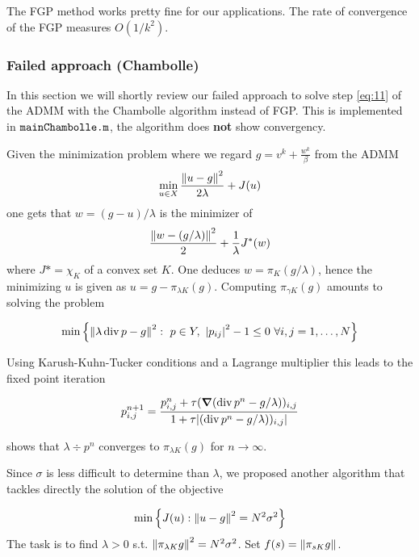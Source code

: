 The FGP method works pretty fine for our applications.
The rate of convergence of the FGP measures $O(1/k^2)$.

\subsubsection{Failed approach (Chambolle)} \label{subsec:chambolle}
In this section we will shortly review our failed approach to solve step \ref{eq:11} of the ADMM with the Chambolle algorithm \cite{MR2049783} instead of FGP. This is implemented in $\texttt{mainChambolle.m}$, the algorithm does \textbf{not} show convergency.

Given the minimization problem where we regard $g = v^k + \frac{w^k}{\beta}$ from the ADMM
\begin{equation}
    \min_{u \in X} \frac{\left\lVert u-g\right\rVert^2}{2 \lambda} + J(u)
\end{equation}
one gets that $w = (g-u)/ \lambda$ is the minimizer of
\begin{equation}
    \frac{\left\lVert w-(g/ \lambda)\right\rVert^2}{2} + \frac{1}{\lambda} J^*(w)
\end{equation}
where $J*=\chi_K$ of a convex set $K$. One deduces $w = \pi_K(g/ \lambda)$, hence the minimizing $u$ is given as $u = g-\pi_{\lambda K}(g)$. Computing $\pi_{\gamma K}(g)$ amounts to solving the problem

\begin{equation}
    \min \left\{ \norm{\lambda \div p -g}^2: \ p \in Y, \ \abs{p_{ij}}^2 -1 \leq 0 \ \forall i,j = 1,\ldots,N \right\}
\end{equation}

Using Karush-Kuhn-Tucker conditions and a Lagrange multiplier this leads to the fixed point iteration

\begin{equation}
    p_{i,j}^{n+1} = \frac{p_{i,j}^n + \tau(\grad(\div p^n - g/ \lambda))_{i,j}}{1+\tau \abs{(\div p^n - g/ \lambda))_{i,j}}}
\end{equation}

\cite[Theorem 3.1]{MR2049783} shows that $\lambda \div p^n$ converges to $\pi_{\lambda K}(g)$ for $n \to \infty$.

Since $\sigma$ is less difficult to determine than $\lambda$, we proposed another algorithm that tackles directly the solution of the objective

\begin{equation} \label{eq:Ch11}
    \min \left\{ J(u): \left\lVert u-g\right\rVert^2 = N^2 \sigma^2 \right\}
\end{equation}
The task is to find $\lambda > 0$ s.t. $\left\lVert\pi_{\lambda K} g\right\rVert^2 = N^2 \sigma^2$. Set $f(s) = \left\lVert\pi_{sK}g\right\rVert$.

